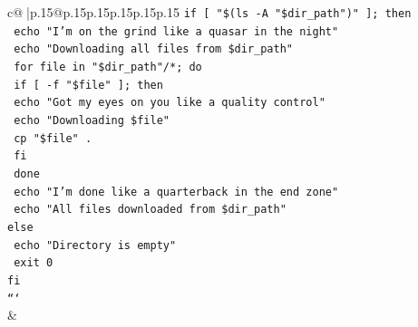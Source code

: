 \documentclass{article}
\begin{document}
{\begin{supertabular}{c@{$\;$}|p{.15\linewidth}@{}p{.15\linewidth}p{.15\linewidth}p{.15\linewidth}p{.15\linewidth}p{.15\linewidth}}
{{{\texttt{if {[} "\$(ls {-}A "\$dir\_path")" {]}; then} \\
\texttt{  echo "I'm on the grind like a quasar in the night"} \\
\texttt{  echo "Downloading all files from \$dir\_path"} \\
\texttt{  for file in "\$dir\_path"/*; do} \\
\texttt{    if {[} {-}f "\$file" {]}; then} \\
\texttt{      echo "Got my eyes on you like a quality control"} \\
\texttt{      echo "Downloading \$file"} \\
\texttt{      cp "\$file" .} \\
\texttt{    fi} \\
\texttt{  done} \\
\texttt{  echo "I'm done like a quarterback in the end zone"} \\
\texttt{  echo "All files downloaded from \$dir\_path"} \\
\texttt{else} \\
\texttt{  echo "Directory is empty"} \\
\texttt{  exit 0} \\
\texttt{fi} \\
\texttt{```} \\
            }
        }
    }
    & \\ \\

\end{supertabular}
}
\end{document}
